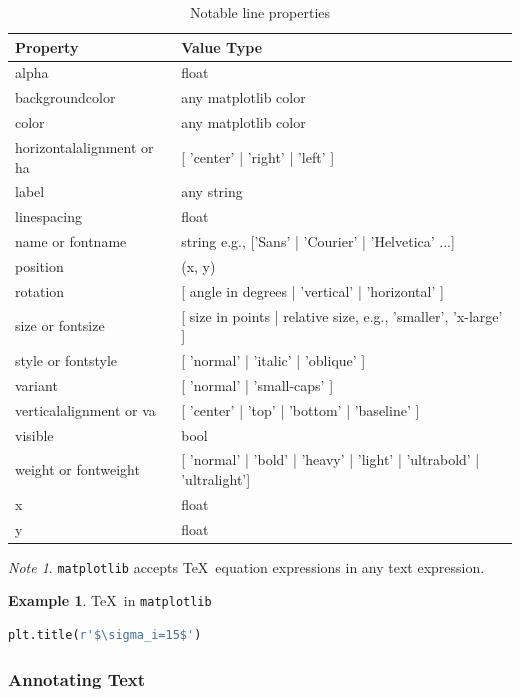 \documentclass{article}
\theoremstyle{definition}
\newtheorem{ex}{Example}[subsection]
\theoremstyle{remark}
\newtheorem*{nb}{Note}
\begin{document}
\begin{table}[h!]
    \centering
    \begin{tabular}{ p{4cm} p{8cm}}
	\hline
	Property & Value Type \\
	\hline
	alpha &	float \\
	backgroundcolor &	any matplotlib color \\
	color &	any matplotlib color \\
	horizontalalignment or ha &	[ 'center' | 'right' | 'left' ] \\
	label &	any string \\
	linespacing &	float \\
	name or fontname &	string e.g., ['Sans' | 'Courier' | 'Helvetica' ...] \\
	position &	(x, y) \\
	rotation &	[ angle in degrees | 'vertical' | 'horizontal' ] \\
	size or fontsize &	[ size in points | relative size, e.g., 'smaller', 'x-large' ] \\
	style or fontstyle &	[ 'normal' | 'italic' | 'oblique' ] \\
	variant &	[ 'normal' | 'small-caps' ] \\
	verticalalignment or va &	[ 'center' | 'top' | 'bottom' | 'baseline' ] \\
	visible &	bool \\
	weight or fontweight &	[ 'normal' | 'bold' | 'heavy' | 'light' | 'ultrabold' | 'ultralight'] \\
	x &	float \\
	y &	float \\
	\hline
    \end{tabular}
    \caption{Notable line properties}
    \label{tabel:mpl_line_props}
\end{table}

\begin{nb}
    \lstinline{matplotlib} accepts \TeX\ equation expressions in any text expression.
\end{nb}

\begin{ex}\TeX\ in \lstinline{matplotlib}
\begin{lstlisting}[language=Python]
plt.title(r'$\sigma_i=15$')
\end{lstlisting}
\end{ex}

\subsubsection{Annotating Text}
\end{document}

